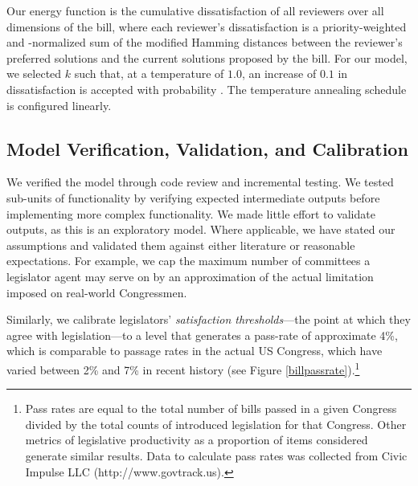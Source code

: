 \documentclass[pdftex,12pt]{llncs}
\begin{document}
Our energy function is the cumulative dissatisfaction of all reviewers over all dimensions of the bill, where each reviewer's dissatisfaction is a priority-weighted and -normalized sum of the modified Hamming distances between the reviewer's preferred solutions and the current solutions proposed by the bill.  For our model, we selected $k$ such that, at a temperature of $1.0$, an increase of $0.1$ in dissatisfaction is accepted with probability .  The temperature annealing schedule is configured linearly.

\subsection{Model Verification, Validation, and Calibration}
We verified the model through code review and incremental testing.
We tested sub-units of functionality by verifying expected intermediate outputs before implementing more complex functionality.
We made little effort to validate outputs, as this is an exploratory model.  
Where applicable, we have stated our assumptions and validated them against either literature or reasonable expectations.  
For example, we cap the maximum number of committees a legislator agent may serve on by an approximation of the actual limitation imposed on real-world Congressmen.

Similarly, we calibrate legislators' \textit{satisfaction thresholds}---the point at which they agree with legislation---to a level that generates a pass-rate of approximate 4\%, which is comparable to passage rates in the actual US Congress, which have varied between 2\% and 7\% in recent history (see Figure \ref{billpassrate}).\footnote{Pass rates are equal to the total number of bills passed in a given Congress divided by the total counts of introduced legislation for that Congress. Other metrics of legislative productivity as a proportion of items considered generate similar results. Data to calculate pass rates was collected from Civic Impulse LLC (http://www.govtrack.us).\label{passfn}}


\printbibliography
\end{document}
